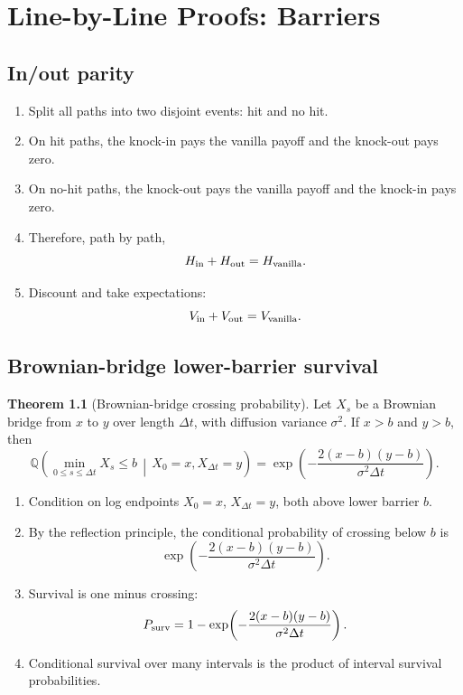 \documentclass[11pt,oneside]{book}
\theoremstyle{definition}
\newtheorem{theorem}{Theorem}[chapter]
\newenvironment{proofsteps}
{\begin{enumerate}[label=\textbf{Line \arabic*.}, itemsep=0.35em]}
{\end{enumerate}}
\newcommand{\Q}{\mathbb{Q}}
\begin{document}
\chapter{Line-by-Line Proofs: Barriers}

\section{In/out parity}
\begin{proofsteps}
\item Split all paths into two disjoint events: hit and no hit.
\item On hit paths, the knock-in pays the vanilla payoff and the knock-out pays zero.
\item On no-hit paths, the knock-out pays the vanilla payoff and the knock-in pays zero.
\item Therefore, path by path,
\[
H_{\rm in}+H_{\rm out}=H_{\rm vanilla}.
\]
\item Discount and take expectations:
\[
V_{\rm in}+V_{\rm out}=V_{\rm vanilla}.
\]
\end{proofsteps}

\section{Brownian-bridge lower-barrier survival}
\begin{theorem}[Brownian-bridge crossing probability]
Let \(X_s\) be a Brownian bridge from \(x\) to \(y\) over length \(\Delta t\), with diffusion variance \(\sigma^2\). If \(x>b\) and \(y>b\), then
\[
  \Q\!\left(\min_{0\le s\le\Delta t}X_s\le b\,\middle|\,X_0=x,X_{\Delta t}=y\right)
  =
  \exp\!\left(-\frac{2(x-b)(y-b)}{\sigma^2\Delta t}\right).
\]
\end{theorem}
\begin{proofsteps}
\item Condition on log endpoints \(X_0=x\), \(X_{\Delta t}=y\), both above lower barrier \(b\).
\item By the reflection principle, the conditional probability of crossing below \(b\) is
\[
\exp\!\left(-\frac{2(x-b)(y-b)}{\sigma^2\Delta t}\right).
\]
\item Survival is one minus crossing:
\[
P_{\rm surv}=1-\exp\!\left(-\frac{2(x-b)(y-b)}{\sigma^2\Delta t}\right).
\]
\item Conditional survival over many intervals is the product of interval survival probabilities.
\end{proofsteps}
\end{document}
